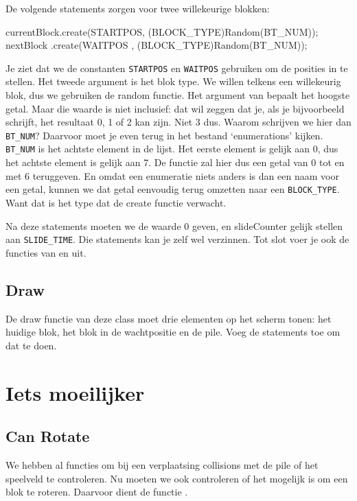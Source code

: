 De volgende statements zorgen voor twee willekeurige blokken:

\begin{code}
currentBlock.create(STARTPOS, (BLOCK_TYPE)Random(BT_NUM));
nextBlock   .create(WAITPOS , (BLOCK_TYPE)Random(BT_NUM));
\end{code}

Je ziet dat we de constanten \verb|STARTPOS| en \verb|WAITPOS| gebruiken om de posities in te stellen. Het tweede argument is het blok type. We willen telkens een willekeurig blok, dus we gebruiken de random functie. Het argument van  bepaalt het hoogste getal. Maar die waarde is niet inclusief: dat wil zeggen dat je, als je bijvoorbeeld  schrijft, het resultaat 0, 1 of 2 kan zijn. Niet 3 dus. Waarom schrijven we hier dan \verb|BT_NUM|? Daarvoor moet je even terug in het bestand `enumerations' kijken. \verb|BT_NUM| is het achtste element in de lijst. Het eerste element is gelijk aan 0, dus het achtste element is gelijk aan 7. De  functie zal hier dus een getal van 0 tot en met 6 teruggeven. En omdat een enumeratie niets anders is dan een naam voor een getal, kunnen we dat getal eenvoudig terug omzetten naar een \verb|BLOCK_TYPE|. Want dat is het type dat de create functie verwacht.

Na deze statements moeten we  de waarde 0 geven, en slideCounter gelijk stellen aan \verb|SLIDE_TIME|. Die statements kan je zelf wel verzinnen. Tot slot voer je ook de  functies van  en  uit.

\subsection{Draw}
De draw functie van deze class moet drie elementen op het scherm tonen: het huidige blok, het blok in de wachtpositie en de pile. Voeg de statements toe om dat te doen.

\section{Iets moeilijker}

\subsection{Can Rotate}
We hebben al functies om bij een verplaatsing collisions met de pile of het speelveld te controleren. Nu moeten we ook controleren of het mogelijk is om een blok te roteren. Daarvoor dient de functie .

